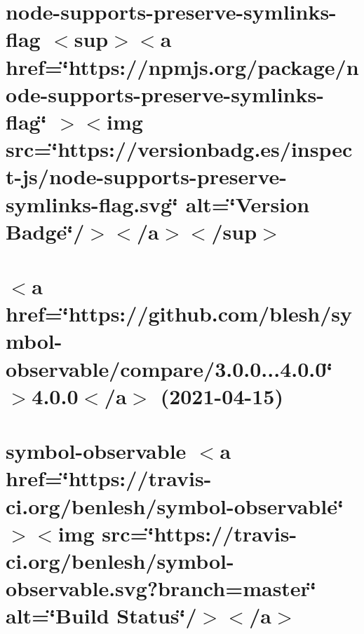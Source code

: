 \documentclass[twoside]{book}
\newcommand{\+}{\discretionary{\mbox{\scriptsize$\hookleftarrow$}}{}{}}
\begin{document}
\chapter{node-\/supports-\/preserve-\/symlinks-\/flag \texorpdfstring{$<$}{<}sup\texorpdfstring{$>$}{>}\texorpdfstring{$<$}{<}a href=\char`\"{}https\+://npmjs.\+org/package/node-\/supports-\/preserve-\/symlinks-\/flag\char`\"{} \texorpdfstring{$>$}{>}\texorpdfstring{$<$}{<}img src=\char`\"{}https\+://versionbadg.\+es/inspect-\/js/node-\/supports-\/preserve-\/symlinks-\/flag.\+svg\char`\"{} alt=\char`\"{}\+Version Badge\char`\"{}/\texorpdfstring{$>$}{>}\texorpdfstring{$<$}{<}/a\texorpdfstring{$>$}{>}\texorpdfstring{$<$}{<}/sup\texorpdfstring{$>$}{>}}
\label{md__c___users_vaishnavi_jadhav__desktop__developer_code_mean_stack_example_client_node_modules_se14cec96e4f9a3b002e03a3d363b4182}

\chapter{\texorpdfstring{$<$}{<}a href=\char`\"{}https\+://github.\+com/blesh/symbol-\/observable/compare/3.\+0.\+0...\+4.\+0.\+0\char`\"{} \texorpdfstring{$>$}{>}4.0.0\texorpdfstring{$<$}{<}/a\texorpdfstring{$>$}{>} (2021-\/04-\/15)}
\label{md__c___users_vaishnavi_jadhav__desktop__developer_code_mean_stack_example_client_node_modules_sb91e49e09b2ec145b0cf22eb39f753e5}

\chapter{symbol-\/observable \texorpdfstring{$<$}{<}a href=\char`\"{}https\+://travis-\/ci.\+org/benlesh/symbol-\/observable\char`\"{} \texorpdfstring{$>$}{>}\texorpdfstring{$<$}{<}img src=\char`\"{}https\+://travis-\/ci.\+org/benlesh/symbol-\/observable.\+svg?branch=master\char`\"{} alt=\char`\"{}\+Build Status\char`\"{}/\texorpdfstring{$>$}{>}\texorpdfstring{$<$}{<}/a\texorpdfstring{$>$}{>}}
\label{md__c___users_vaishnavi_jadhav__desktop__developer_code_mean_stack_example_client_node_modules_symbol_observable__r_e_a_d_m_e}

\end{document}
